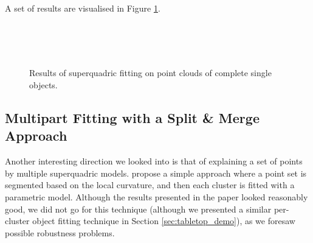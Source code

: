 \documentclass{article}
\begin{document}
A set of results are visualised in Figure \ref{fig:fitting_results}.

\begin{figure}
\centering
{} \\
 \\
 \\

\caption {Results of superquadric fitting on point clouds of complete single objects.}
\label{fig:fitting_results}
\end{figure}


\subsection {Multipart Fitting with a Split \& Merge Approach}

Another interesting direction we looked into is that of explaining a set of points by multiple superquadric models. \cite{doi:10.1117/1.1762516} propose a simple approach where a point set is segmented based on the local curvature, and then each cluster is fitted with a parametric model. Although the results presented in the paper looked reasonably good, we did not go for this technique (although we presented a similar per-cluster object fitting technique in Section \ref{sec:tabletop_demo}), as we foresaw possible robustness problems.
\end{document}
